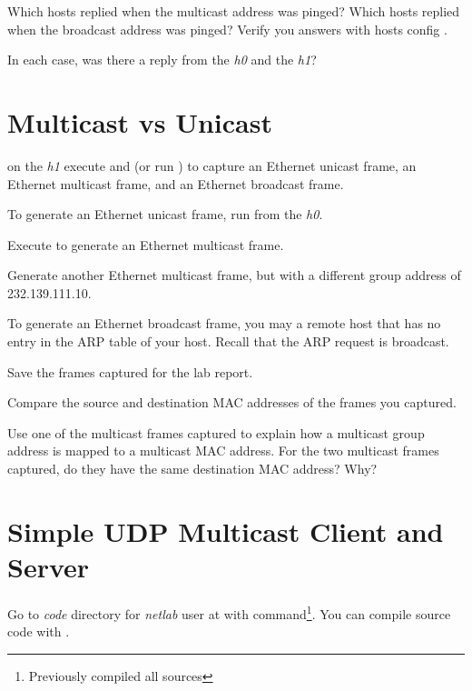 \documentclass{../UTNetLab}
\begin{document}
\begin{report}
    \item Which hosts replied when the multicast address was pinged?
    Which hosts replied when the broadcast address was pinged?
    Verify you answers with hosts config .

    \item In each case, was there a reply from the \textit{h0} and the \textit{h1}?
\end{report}

\section{Multicast vs Unicast}
on the \textit{h1} execute  and  (or run ) to capture an Ethernet unicast frame, an Ethernet multicast frame, and an Ethernet broadcast frame.

To generate an Ethernet unicast frame, run  from the \textit{h0}.

Execute  to generate an Ethernet multicast frame.

Generate another Ethernet multicast frame, but with a different group address of {232.139.111.10}.

To generate an Ethernet broadcast frame, you may  a remote host that has no entry in the ARP table of your host.
Recall that the ARP request is broadcast.

Save the frames captured for the lab report.

\begin{report}
    \item Compare the source and destination MAC addresses of the frames you captured.

    \item Use one of the multicast frames captured to explain how a multicast group address is mapped to a multicast MAC address.
    For the two multicast frames captured, do they have the same destination MAC address?
    Why?
\end{report}

\section{Simple UDP Multicast Client and Server}
Go to \textit{code} directory for \textit{netlab} user at  with  command\footnote{Previously compiled all sources}.
You can compile source code with .
\end{document}

